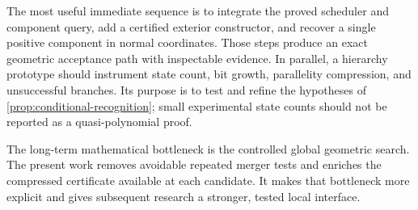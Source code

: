 The most useful immediate sequence is to integrate the proved scheduler and
component query, add a certified exterior constructor, and recover a single
positive component in normal coordinates.  Those steps produce an exact
geometric acceptance path with inspectable evidence.  In parallel, a
hierarchy prototype should instrument state count, bit growth, parallelity
compression, and unsuccessful branches.  Its purpose is to test and refine
the hypotheses of \cref{prop:conditional-recognition}; small experimental
state counts should not be reported as a quasi-polynomial proof.

The long-term mathematical bottleneck is the controlled global geometric
search.  The present work removes avoidable repeated merger tests and
enriches the compressed certificate available at each candidate.  It makes
that bottleneck more explicit and gives subsequent research a stronger,
tested local interface.
